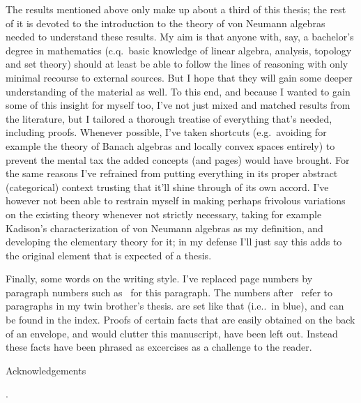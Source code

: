 \documentclass[b5paper]{book}
\begin{document}
\begin{parsec}
\begin{point}
The results mentioned above only
make up 
about a third of this thesis;
the rest of it is devoted to 
the introduction to the theory of von Neumann algebras
needed to understand these results.
My aim is that anyone 
with, say, a bachelor's degree in mathematics
(c.q.~basic knowledge of linear algebra,
analysis, topology and set theory)
should at least be able to follow the lines of reasoning
with only minimal recourse to external sources.
But I hope that they will gain some deeper understanding
of the material as well.
To this end, and because I wanted to gain some of this insight
for myself too,
I've not just mixed
and matched
results from the literature,
but I tailored a thorough treatise
of everything that's needed,
including proofs.
Whenever possible,
I've taken shortcuts
(e.g.~avoiding for example
the theory of Banach algebras
and locally convex spaces entirely)
to  prevent the mental tax
the added concepts
(and pages) would have brought.
For the same reasons
I've refrained from putting
everything in its proper abstract (categorical) context
trusting that it'll shine through of its own accord.
I've however not been able to restrain
myself in making perhaps frivolous variations on the existing
theory whenever not strictly necessary,
taking for example Kadison's characterization
of von Neumann algebras
as my definition,
and developing the elementary theory for it;
in my defense I'll just say this adds to
the original element that is expected of a thesis.
\end{point}
\begin{point}
Finally, some words on the writing style.
I've replaced page numbers by
paragraph numbers
such as~
for this paragraph.
The numbers after~ refer to paragraphs
	in my twin brother's thesis.
 are set like that
(i.e..~in blue),
and can be found in the index.
Proofs of certain facts
that are easily obtained on the back of an envelope,
and would clutter this manuscript,
have been left out.
Instead these facts have been phrased as excercises
as a challenge to the reader.
\end{point}
	\begin{point}{Acknowledgements} 
	\end{point}
\end{parsec}

%




\begin{parsec}
	\begin{point}[conclusion]
.
\end{point}
\end{parsec}

\backmatter

\fancyfoot[CE]{}
\fancyfoot[CO]{}

\printindex

{}

\end{document}
